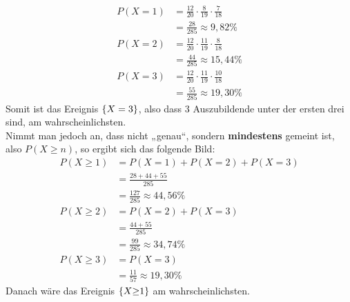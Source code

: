 \documentclass[main.tex]{subfiles}
\begin{document}
$$\begin{aligned}
    P(X{=}1) &= \frac{12}{20} \cdot \frac{8}{19} \cdot \frac{7}{18} \\
    &= \frac{28}{285} \approx 9,82\% \\
    P(X{=}2) &= \frac{12}{20} \cdot \frac{11}{19} \cdot \frac{8}{18} \\
    &= \frac{44}{285} \approx 15,44\% \\
    P(X{=}3) &= \frac{12}{20} \cdot \frac{11}{19} \cdot \frac{10}{18} \\
    &= \frac{55}{285} \approx 19,30\%
\end{aligned}$$
Somit ist das Ereignis $\set*{X=3}$, also dass 3 Auszubildende unter der ersten drei sind, am wahrscheinlichsten.\\

Nimmt man jedoch an, dass nicht „genau“, sondern \textbf{mindestens} gemeint ist, also $P(X{\geq}n)$, so ergibt sich das folgende Bild:
$$\begin{aligned}
    P(X{\geq}1) &= P(X{=}1) + P(X{=}2) + P(X{=}3) \\[1mm]
    &= \frac{28 + 44 + 55}{285} \\[1mm]
    &= \frac{127}{285} \approx 44,56\% \\[4mm]
    P(X{\geq}2) &= P(X{=}2) + P(X{=}3) \\[1mm]
    &= \frac{44 + 55}{285} \\[1mm]
    &= \frac{99}{285} \approx 34,74\% \\[4mm]
    P(X{\geq}3) &= P(X{=}3) \\[1mm]
    &= \frac{11}{57} \approx 19,30\%
\end{aligned}$$
Danach wäre das Ereignis $\set*{X{\geq}1}$ am wahrscheinlichsten.
\end{document}
